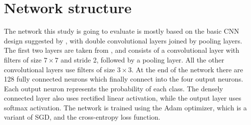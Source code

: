 \documentclass{kththesis}
\begin{document}
\begin{minipage}{.7\linewidth}
  \section{Network structure}
  The network this study is going to evaluate is mostly based on the basic CNN design suggested by \textcite{cnnIntro}, with double convolutional layers joined by pooling layers. The first two layers are taken from \textcite{islam2018early}, and consists of a convolutional layer with filters of size $7 \times 7$ and stride 2, followed by a pooling layer. All the other convolutional layers use filters of size $3 \times 3$. At the end of the network there are 128 fully connected neurons which finally connect into the four output neurons. Each output neuron represents the probability of each class. The densely connected layer also uses rectified linear activation, while the output layer uses softmax activation. The network is trained using the Adam optimizer, which is a variant of SGD, and the cross-entropy loss function.

\end{minipage}
\end{document}
